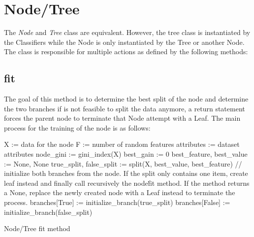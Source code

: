 \section{Node/Tree}

The \textit{Node} and \textit{Tree} class are equivalent. However, the tree class is instantiated by the Classifiers while the Node is only instantiated by the Tree or another Node. The class is responsible for multiple actions as defined by the following methods:

\subsection{fit}

The goal of this method is to determine the best split of the node and determine the two branches if is not feasible to split the data anymore, a return statement forces the parent node to terminate that Node attempt with a Leaf. The main process for the training of the node is as follows:

\begin{algorithm}[H]
\SetAlgoLined
{}
    X := data for the node\;
    F := number of random features\;
    attributes := dataset attributes\;
    node\_gini := gini\_index(X)\;
    best\_gain := 0\;
    best\_feature, best\_value := None, None\;
    true\_split, false\_split := split(X, best\_value, best\_feature)\;
    // initialize both branches from the node. If the split only contains one item, create leaf instead and finally call recursively the node\.fit method. If the method returns a None, replace the newly created node with a Leaf instead to terminate the process.\;
    branches[True] := initialize\_branch(true\_split)\;
    branches[False] := initialize\_branch(false\_split)\;
    \caption{Node/Tree fit method}
\end{algorithm}

